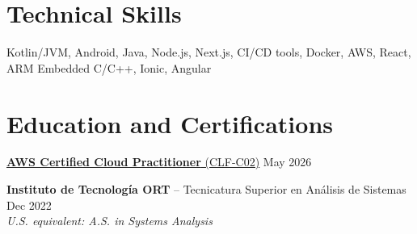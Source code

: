\documentclass[11pt]{article}       %
\begin{document}
\section*{Technical Skills}

Kotlin/JVM, Android, Java, Node.js, Next.js, CI/CD tools, Docker, AWS, React, ARM Embedded C/C++, Ionic, Angular \\

\section*{Education and Certifications}

\href{https://cp.certmetrics.com/amazon/en/public/verify/credential/668debd4b87c4628ad6c8d2e9cc07c24}{\textbf{AWS Certified Cloud Practitioner} (CLF-C02)} \hfill May 2026 \\

\vspace{6pt}

\textbf{Instituto de Tecnología ORT} -- Tecnicatura Superior en Análisis de Sistemas \hfill Dec 2022 \\
\textit{U.S. equivalent: A.S. in Systems Analysis}
\end{document}
